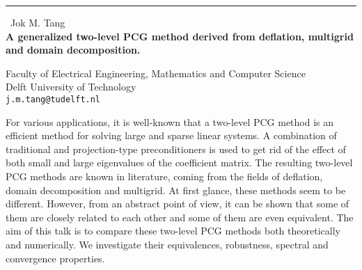 \documentclass{report}
\begin{document}
\begin{center}
\rule{6in}{1pt} \
{\large Jok M. Tang \\
{\bf 
A generalized two-level PCG method derived from deflation,
multigrid and domain decomposition.
}}

Faculty of Electrical Engineering, Mathematics and Computer Science \\ 
Delft University of Technology \\
{\tt j.m.tang@tudelft.nl}
\end{center}


For various applications, it is well-known that a two-level PCG method is an
efficient method for solving large and sparse linear systems. A combination
of traditional and projection-type preconditioners is used to get rid of the
effect of both small and large eigenvalues of the coefficient matrix. The
resulting two-level PCG methods are known in literature, coming from the
fields of deflation, domain decomposition and multigrid. At first glance,
these methods seem to be different. However, from an abstract point of view,
it can be shown that some of them are closely related to each other and some
of them are even equivalent. The aim of this talk is to compare these
two-level PCG methods both theoretically and numerically. We investigate
their equivalences, robustness, spectral and convergence properties.
\end{document}
